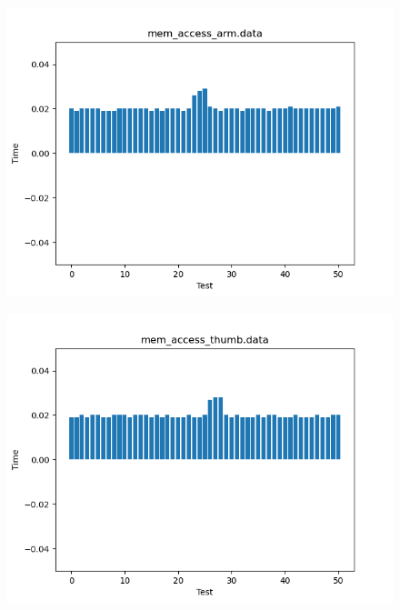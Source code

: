 \documentclass[a4paper,10pt]{article}
\begin{document}
\begin{figure}[H]
 \includegraphics[width=\linewidth]{data/mem_access_arm.png}
\end{figure}

\begin{figure}[H]
 \includegraphics[width=\linewidth]{data/mem_access_thumb.png}
\end{figure}
\end{document}
